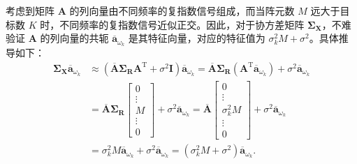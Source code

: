 考虑到矩阵 \(\mathbf{A}\) 的列向量由不同频率的复指数信号组成，而当阵元数 \(M\) 远大于目标数 \(K\) 时，不同频率的复指数信号近似正交。因此，对于协方差矩阵 \(\mathbf{\Sigma}_{\mathbf{X}}\)，不难验证 \(\mathbf{A}\) 的列向量的共轭 \(\overline{\bm{a}}_{\omega_k}\) 是其特征向量，对应的特征值为 \(\sigma_k^2 M + \sigma^2\)。具体推导如下：
\[
    \begin{split}
        \mathbf{\Sigma}_{\mathbf{X}} \overline{\bm{a}}_{\omega_k}
         & \approx \left( \overline{\mathbf{A}} \mathbf{\Sigma}_{\mathbf{R}} \mathbf{A}^{\mathrm{T}} + \sigma^2 \mathbf{I} \right) \overline{\bm{a}}_{\omega_k}
        = \overline{\mathbf{A}} \mathbf{\Sigma}_{\mathbf{R}} \left( \mathbf{A}^{\mathrm{T}} \overline{\bm{a}}_{\omega_k} \right) + \sigma^2 \overline{\bm{a}}_{\omega_k}                            \\
         & = \overline{\mathbf{A}} \mathbf{\Sigma}_{\mathbf{R}} \begin{bmatrix}
                                                                    0      \\
                                                                    \vdots \\
                                                                    M      \\
                                                                    \vdots \\
                                                                    0
                                                                \end{bmatrix} + \sigma^2 \overline{\bm{a}}_{\omega_k} = \overline{\mathbf{A}} \begin{bmatrix}
                                                                                                                                                  0            \\
                                                                                                                                                  \vdots       \\
                                                                                                                                                  \sigma_k^2 M \\
                                                                                                                                                  \vdots       \\
                                                                                                                                                  0
                                                                                                                                              \end{bmatrix} + \sigma^2 \overline{\bm{a}}_{\omega_k} \\
         & = \sigma_k^2 M \overline{\bm{a}}_{\omega_k} + \sigma^2 \overline{\bm{a}}_{\omega_k}
        = \left( \sigma_k^2 M + \sigma^2 \right) \overline{\bm{a}}_{\omega_k}.
    \end{split}
\]

